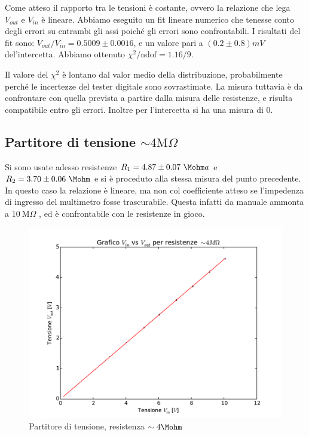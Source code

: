 \documentclass[10pt,a4paper]{article}
\begin{document}
Come atteso il rapporto tra le tensioni è costante, ovvero la relazione che lega $V_{out}$ e $V_{in}$ è lineare.
Abbiamo eseguito un fit lineare numerico che tenesse conto degli errori su entrambi gli assi poiché gli errori sono confrontabili. I risultati del fit sono: $V_{out}/V_{in}=0.5009 \pm 0.0016$, e un valore pari a $(0.2\pm 0.8) mV$ del'intercetta. Abbiamo ottenuto  $\chi^2/\text{ndof}= 1.16/9$.

Il valore del $\chi^2$ è lontano dal valor medio della distribuzione, probabilmente perché le incertezze del tester digitale sono sovrastimate. La misura tuttavia è da confrontare con quella prevista a partire dalla misura delle resistenze, e risulta compatibile entro gli errori. Inoltre per l'intercetta si ha una misura di $0$.

\subsection{Partitore di tensione $\sim4\text{M}\Omega$}
Si sono usate adesso resistenze $R_1=4.87 \pm 0.07 ~\Mohm a$ e $R_2=3.70 \pm 0.06 ~\Mohm$ e si è proceduto alla stessa misura del punto precedente. In questo caso la relazione è lineare, ma non col coefficiente atteso se l'impedenza di ingresso del multimetro fosse trascurabile. Questa infatti da manuale ammonta a $10 ~ \text{M}\Omega$ , ed è confrontabile con le resistenze in gioco.

\begin{figure}[h]
\centering
	\begin{minipage}[h]{0.35\textwidth}
		\centering
		
	\end{minipage}%
	\begin{minipage}[h]{0.65\textwidth}
		\centering
		\includegraphics[width=1\textwidth]{../grafici/fit_4MOhm.pdf}
		\caption{Partitore di tensione, resistenza $\sim 4\Mohm$}
	\end{minipage}
\end{figure}
\end{document}

